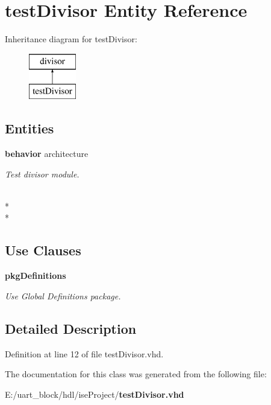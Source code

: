 \section{test\-Divisor Entity Reference}
\label{classtest_divisor}
Inheritance diagram for test\-Divisor\-:\begin{figure}[H]
\begin{center}
\leavevmode
\includegraphics[height=2.000000cm]{classtest_divisor}
\end{center}
\end{figure}
\subsection*{Entities}
\begin{DoxyCompactItemize}
\item 
{\bf behavior} architecture
\begin{DoxyCompactList}\small\item\em Test divisor module. \end{DoxyCompactList}\end{DoxyCompactItemize}
\\*
\\*
\subsection*{Use Clauses}
 \begin{DoxyCompactItemize}
\item 
{\bf pkg\-Definitions}   \label{classtest_divisor_ac442dca664056131bdaf5c92e4351e01}

\begin{DoxyCompactList}\small\item\em Use Global Definitions package. \end{DoxyCompactList}\end{DoxyCompactItemize}


\subsection{Detailed Description}


Definition at line 12 of file test\-Divisor.\-vhd.



The documentation for this class was generated from the following file\-:\begin{DoxyCompactItemize}
\item 
E\-:/uart\-\_\-block/hdl/ise\-Project/{\bf test\-Divisor.\-vhd}\end{DoxyCompactItemize}
